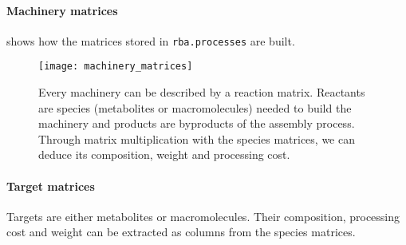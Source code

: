 \paragraph{Machinery matrices}  shows how the matrices stored in \texttt{rba.processes} are built.
\begin{figure}[ht]
  \centering
  \texttt{[image: machinery\_matrices]}
  \caption{Every machinery can be described by a reaction matrix. Reactants are species (metabolites or macromolecules) needed to build the machinery and products are byproducts of the assembly process. Through matrix multiplication with the species matrices, we can deduce its composition, weight and processing cost.}
  \label{fig:machinery_matrices}
\end{figure}

\paragraph{Target matrices} Targets are either metabolites or macromolecules. Their composition, processing cost and weight can be extracted as columns from the species matrices.
